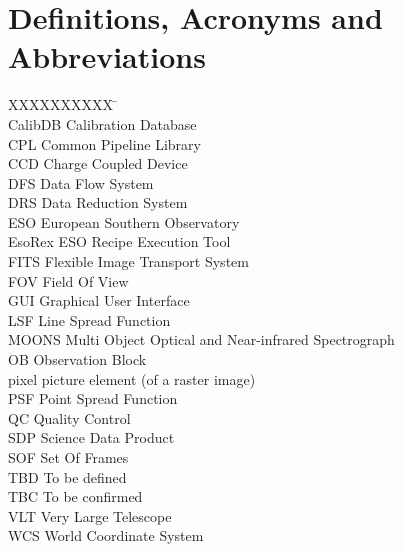 \section{Definitions, Acronyms and Abbreviations}
\label{sec:acronyms}

\begin{tabbing}
XXXXXXXXXX \= \kill \\
CalibDB    \> Calibration Database \\
CPL        \> Common Pipeline Library \\
CCD        \> Charge Coupled Device \\
DFS        \> Data Flow System \\
DRS        \> Data Reduction System \\
ESO        \> European Southern Observatory \\
EsoRex     \> ESO Recipe Execution Tool \\
FITS       \> Flexible Image Transport System \\
FOV        \> Field Of View \\
GUI        \> Graphical User Interface \\
LSF        \> Line Spread Function \\
MOONS      \> Multi Object Optical and Near-infrared Spectrograph \\
OB        \> Observation Block \\
pixel     \> picture element (of a raster image) \\
PSF       \> Point Spread Function \\
QC        \> Quality Control \\
SDP       \> Science Data Product \\
SOF       \> Set Of Frames \\
TBD       \> To be defined \\
TBC       \> To be confirmed \\
VLT       \> Very Large Telescope \\
WCS       \> World Coordinate System \\
\end{tabbing}

